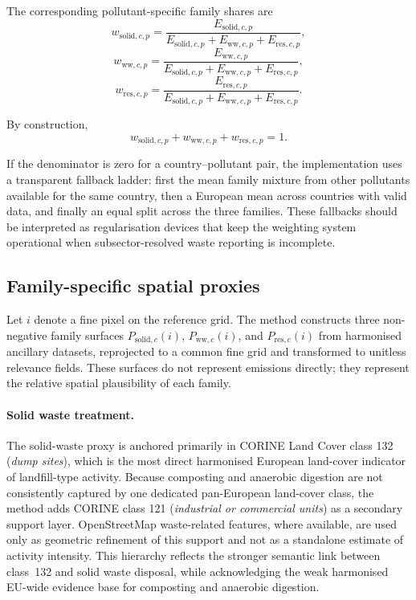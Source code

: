 The corresponding pollutant-specific family shares are
\begin{equation}
  w_{\mathrm{solid},c,p} =
  \frac{E_{\mathrm{solid},c,p}}
       {E_{\mathrm{solid},c,p} + E_{\mathrm{ww},c,p} + E_{\mathrm{res},c,p}},
\end{equation}
\begin{equation}
  w_{\mathrm{ww},c,p} =
  \frac{E_{\mathrm{ww},c,p}}
       {E_{\mathrm{solid},c,p} + E_{\mathrm{ww},c,p} + E_{\mathrm{res},c,p}},
\end{equation}
\begin{equation}
  w_{\mathrm{res},c,p} =
  \frac{E_{\mathrm{res},c,p}}
       {E_{\mathrm{solid},c,p} + E_{\mathrm{ww},c,p} + E_{\mathrm{res},c,p}}.
\end{equation}

By construction,
\begin{equation}
  w_{\mathrm{solid},c,p} +
  w_{\mathrm{ww},c,p} +
  w_{\mathrm{res},c,p} = 1.
\end{equation}

If the denominator is zero for a country--pollutant pair, the
implementation uses a transparent fallback ladder: first the mean family
mixture from other pollutants available for the same country, then a
European mean across countries with valid data, and finally an equal
split across the three families. These fallbacks should be interpreted
as regularisation devices that keep the weighting system operational
when subsector-resolved waste reporting is incomplete.

\subsection{Family-specific spatial proxies}

Let $i$ denote a fine pixel on the reference grid. The method constructs
three non-negative family surfaces
$P_{\mathrm{solid},c}(i)$, $P_{\mathrm{ww},c}(i)$, and
$P_{\mathrm{res},c}(i)$ from harmonised ancillary datasets, reprojected
to a common fine grid and transformed to unitless relevance fields.
These surfaces do not represent emissions directly; they represent the
relative spatial plausibility of each family.

\paragraph{Solid waste treatment.}
The solid-waste proxy is anchored primarily in CORINE Land Cover class
132 (\emph{dump sites}), which is the most direct harmonised European
land-cover indicator of landfill-type activity. Because composting and
anaerobic digestion are not consistently captured by one dedicated
pan-European land-cover class, the method adds CORINE class 121
(\emph{industrial or commercial units}) as a secondary support layer.
OpenStreetMap waste-related features, where available, are used only as
geometric refinement of this support and not as a standalone estimate of
activity intensity. This hierarchy reflects the stronger semantic link
between class~132 and solid waste disposal, while acknowledging the weak
harmonised EU-wide evidence base for composting and anaerobic digestion.

